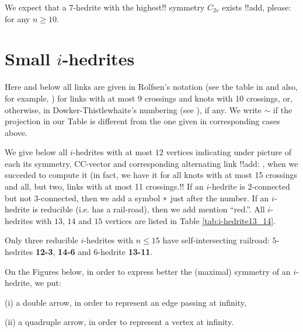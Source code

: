 \documentclass[12pt]{article}
\begin{document}
We expect that a $7$-hedrite with the highest!! symmetry $C_{2v}$ 
exists 
!!add, please: for any $n \ge 10$.




\section{Small $i$-hedrites}

Here and below all links are given 
in Rolfsen's notation (see the table in \cite{Rolf} and also,  
for example, \cite{Kaw}) for links with at most 9 
crossings and knots with 10 crossings, or, otherwise, in
Dowker-Thistlewhaite's numbering (see \cite{T}), if any.
We write $\sim$ if the projection in our Table is different 
from the one given in corresponding cases above.

We give below all $i$-hedrites with at most $12$ vertices indicating under 
picture of each its symmetry, CC-vector and corresponding 
alternating link
!!add: , when we succeded to compute it (in fact, we have it for
all knots with at most 15 crossings and all, but two, links with
at most 11 crossings.!!
If an $i$-hedrite is $2$-connected but not $3$-connected, then we add
a symbol ${\bf *}$ just after the number. If an $i$-hedrite is reducible
(i.e. has a rail-road), then we add mention ``red.''. All $i$-hedrites
with $13$, $14$ and $15$ vertices are listed in Table
\ref{tab:i-hedrite13_14}.

Only three reducible $i$-hedrites with $n \leq 15$ have self-intersecting
railroad: $5$-hedrites {\bf 12-3}, {\bf 14-6} and $6$-hedrite {\bf 13-11}.


On the Figures below, in order to express better the (maximal)
symmetry of an $i$-hedrite, we put:

(i) a double arrow, in order to represent an edge passing at infinity,

(ii) a quadruple arrow, in order to represent a vertex at infinity.
\end{document}
